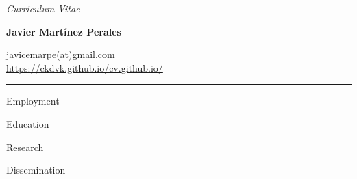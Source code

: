 \documentclass{style_classes/cv_new_academic}
\begin{document}
 
\begin{center}
            \textit{Curriculum Vitae}\\
            {\Large \textbf{Javier Mart\'inez Perales}\par}
            \href{javicemarpe@gmail.com}{javicemarpe(at)gmail.com}\\
            \href{https://ckdvk.github.io/cv.github.io/}{https://ckdvk.github.io/cv.github.io/}
        \end{center}
        \vspace{-0.15in}
        \rule{\textwidth}{1pt}
        \vspace{0.05in}

 
 


  
        \begin{Section}
            {Employment}
          \end{Section}

          
        

 

\newpage

  \begin{Section}
    {Education}
  \end{Section}
 
  
 

\begin{Section}
    {Research} 
  \end{Section}
 

 

 \begin{Section}
    {Dissemination} 
  \end{Section}

    
\end{document}
